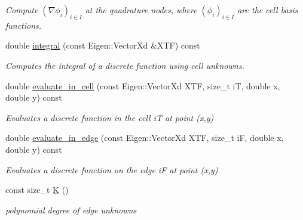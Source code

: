 \begin{DoxyCompactItemize}
\begin{DoxyCompactList}\small\item\em Compute $(\nabla \phi_i)_{i\in I}$ at the quadrature nodes, where $(\phi_i)_{i\in I}$ are the cell basis functions. \end{DoxyCompactList}\item 
\mbox{\label{classHArDCore2D_1_1HybridCore_aed85cdfc0bb96c65ce201528366e92f8}} 
double \hyperlink{classHArDCore2D_1_1HybridCore_aed85cdfc0bb96c65ce201528366e92f8}{integral} (const Eigen\+::\+Vector\+Xd \&X\+TF) const
\begin{DoxyCompactList}\small\item\em Computes the integral of a discrete function using cell unknowns. \end{DoxyCompactList}\item 
\mbox{\label{classHArDCore2D_1_1HybridCore_a58dd478934c1f5b65ae8b7df31e8ead4}} 
double \hyperlink{classHArDCore2D_1_1HybridCore_a58dd478934c1f5b65ae8b7df31e8ead4}{evaluate\+\_\+in\+\_\+cell} (const Eigen\+::\+Vector\+Xd X\+TF, size\+\_\+t iT, double x, double y) const
\begin{DoxyCompactList}\small\item\em Evaluates a discrete function in the cell iT at point (x,y) \end{DoxyCompactList}\item 
\mbox{\label{classHArDCore2D_1_1HybridCore_ae6795e8bc0058be7e399b379333032c8}} 
double \hyperlink{classHArDCore2D_1_1HybridCore_ae6795e8bc0058be7e399b379333032c8}{evaluate\+\_\+in\+\_\+edge} (const Eigen\+::\+Vector\+Xd X\+TF, size\+\_\+t iF, double x, double y) const
\begin{DoxyCompactList}\small\item\em Evaluates a discrete function on the edge iF at point (x,y) \end{DoxyCompactList}\item 
\mbox{\label{classHArDCore2D_1_1HybridCore_a74242d0a8b68fe5d9a35c6eb0effe3b2}} 
const size\+\_\+t \hyperlink{classHArDCore2D_1_1HybridCore_a74242d0a8b68fe5d9a35c6eb0effe3b2}{K} ()
\begin{DoxyCompactList}\small\item\em polynomial degree of edge unknowns \end{DoxyCompactList}\item 

\end{DoxyCompactItemize}
